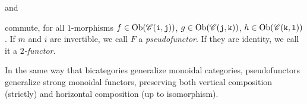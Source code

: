 \begin{definition}
\begin{center}
\quad and \quad{}
\end{center}
\noindent commute, for all $1$-morphisms $f \in \textnormal{Ob}(\mathscr{C}(\textnormal{\texttt{i}}, \textnormal{\texttt{j}}))$, $g \in \textnormal{Ob}(\mathscr{C}(\textnormal{\texttt{j}}, \textnormal{\texttt{k}}))$, $h \in \textnormal{Ob}(\mathscr{C}(\textnormal{\texttt{k}}, \textnormal{\texttt{l}}))$. If $m$ and $i$ are invertible, we call $F$ a {\em pseudofunctor}. If they are identity, we call it a {\em $2$-functor}. 
\end{definition}

\noindent In the same way that bicategories generalize monoidal categories, pseudofunctors generalize strong monoidal functors, preserving both vertical composition (strictly) and horizontal composition (up to isomorphism).\\

